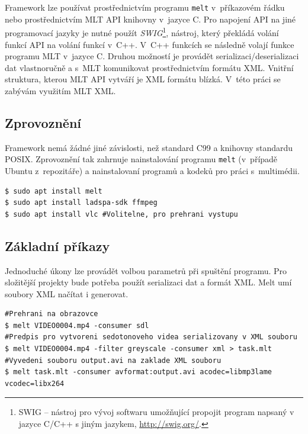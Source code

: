 Framework lze používat prostřednictvím programu \texttt{melt} v~příkazovém řádku nebo prostřednictvím MLT API knihovny v~jazyce C. Pro napojení API na jiné programovací jazyky je nutné použít \textit{SWIG}\footnote{SWIG -- nástroj pro vývoj softwaru umožňující propojit program napsaný v jazyce C/C++ s jiným jazykem, \url{http://swig.org/}.}, nástroj, který překládá volání funkcí API na volání funkcí v~C++. V~C++ funkcích se následně volají funkce programu MLT v~jazyce C. Druhou možností je provádět serializaci/deserializaci dat vlastnoručně a s~MLT komunikovat prostřednictvím formátu XML. Vnitřní struktura, kterou MLT API vytváří je XML formátu blízká. V~této práci se zabývám využitím MLT XML.

\subsection{Zprovoznění}
Framework nemá žádné jiné závislosti, než standard C99 a knihovny standardu POSIX. Zprovoznění tak zahrnuje nainstalování programu \texttt{melt} (v~případě Ubuntu z~repozitáře) a nainstalovaní programů a kodeků pro práci s~multimédii.
\begin{lstlisting}[style=bash]
$ sudo apt install melt
$ sudo apt install ladspa-sdk ffmpeg
$ sudo apt install vlc #Volitelne, pro prehrani vystupu
\end{lstlisting}

\subsection{Základní příkazy}
Jednoduché úkony lze provádět volbou parametrů při spuštění programu. Pro složitější projekty bude potřeba použít serializaci dat a formát XML. Melt umí soubory XML načítat i generovat.
\begin{lstlisting}[style=bash]
#Prehrani na obrazovce
$ melt VIDEO0004.mp4 -consumer sdl
#Predpis pro vytvoreni sedotonoveho videa serializovany v XML souboru
$ melt VIDEO0004.mp4 -filter greyscale -consumer xml > task.mlt 
#Vyvedeni souboru output.avi na zaklade XML souboru
$ melt task.mlt -consumer avformat:output.avi acodec=libmp3lame vcodec=libx264
\end{lstlisting}
